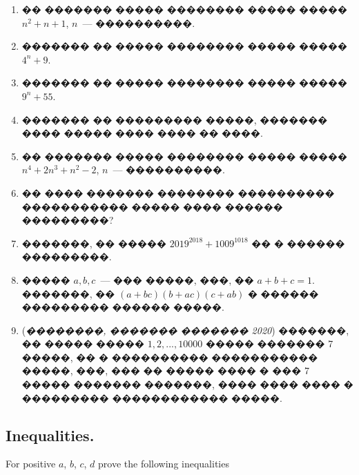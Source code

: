 \documentclass[a4paper,12pt]{article}
\begin{document}
\begin{enumerate}
 \item �� ������� ����� �������� ����� ����� $n^{2}+n+1$, $n$~--- ����������.

\item ������� �� ����� �������� ����� ����� $4^{n}+9$.

\item ������� �� ����� �������� ����� ����� $9^{n}+55$.

\item ������� �� ��������� �����, ������� ���� ����� ���� ���� �� ����.

\item �� ������� ����� �������� ����� ����� $n^{4}+2n^{3}+n^{2}-2$, $n$~--- ����������.

\item �� ���� ������� �������� ���������� ����������� ����� ���� ������ ���������?

\item �������, �� ����� $2019^{2018}+1009^{1018}$ �� � ������ ���������.

\item ����� $a,b,c$~--- ��� �����, ���, �� $a+b+c=1$. �������, �� $(a+bc)(b+ac)(c+ab)$ � ������ ��������� ������ �����.

\item (\textit{��������, ������� ������� 2020}) �������, �� ����� ����� $1,2,...,10000$ ����� ������� 7 �����, �� � ���������� ����������� �����, ���, ��� �� ����� ���� � ��� 7 ����� ������� �������, ���� ���� ���� � ��������� ������������ �����.
\end{enumerate}








\newpage

\begin{center}
\section*{Inequalities.}
\end{center}

For positive $a$, $b$, $c$, $d$ prove the following inequalities

\medskip\medskip\medskip
\end{document}
